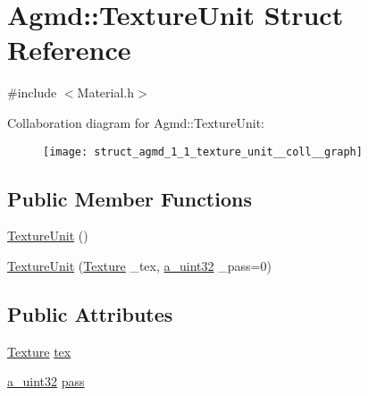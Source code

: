 \hypertarget{struct_agmd_1_1_texture_unit}{\section{Agmd\+:\+:Texture\+Unit Struct Reference}
\label{struct_agmd_1_1_texture_unit}
}


{\ttfamily \#include $<$Material.\+h$>$}



Collaboration diagram for Agmd\+:\+:Texture\+Unit\+:\nopagebreak
\begin{figure}[H]
\begin{center}
\leavevmode
\texttt{[image: struct\_agmd\_1\_1\_texture\_unit\_\_coll\_\_graph]}
\end{center}
\end{figure}
\subsection*{Public Member Functions}
\begin{DoxyCompactItemize}
\item 
\hyperlink{struct_agmd_1_1_texture_unit_ad5846d2a3e2678438d54112bfb818a29}{Texture\+Unit} ()
\item 
\hyperlink{struct_agmd_1_1_texture_unit_acab5a3f7f9064199111e0a29400b9ec1}{Texture\+Unit} (\hyperlink{class_agmd_1_1_texture}{Texture} \+\_\+tex, \hyperlink{_common_defines_8h_a964296f9770051b9e4807b1f180dd416}{a\+\_\+uint32} \+\_\+pass=0)
\end{DoxyCompactItemize}
\subsection*{Public Attributes}
\begin{DoxyCompactItemize}
\item 
\hyperlink{class_agmd_1_1_texture}{Texture} \hyperlink{struct_agmd_1_1_texture_unit_a520920712d784307d9ca50d5b5d2d741}{tex}
\item 
\hyperlink{_common_defines_8h_a964296f9770051b9e4807b1f180dd416}{a\+\_\+uint32} \hyperlink{struct_agmd_1_1_texture_unit_a796c3cde1d494cf42c397a7c67005f6f}{pass}
\end{DoxyCompactItemize}


